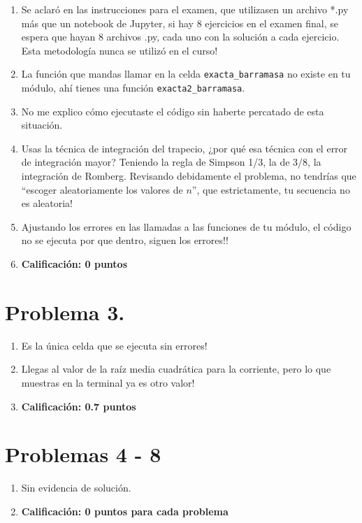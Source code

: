 \begin{enumerate}
\item Se aclaró en las instrucciones para el examen, que utilizasen un archivo *.py más que un notebook de Jupyter, si hay 8 ejercicios en el examen final, se espera que hayan 8 archivos .py, cada uno con la solución a cada ejercicio. Esta metodología nunca se utilizó en el curso!
\item La función que mandas llamar en la celda \texttt{exacta\_barramasa} no existe en tu módulo, ahí tienes una función \texttt{exacta2\_barramasa}.
\item No me explico cómo ejecutaste el código sin haberte percatado de esta situación.
\item Usas la técnica de integración del trapecio, ¿por qué esa técnica con el error de integración mayor? Teniendo la regla de Simpson 1/3, la de 3/8, la integración de Romberg. Revisando debidamente el problema, no tendrías que \enquote{escoger aleatoriamente los valores de $n$}, que estrictamente, tu secuencia no es aleatoria!
\item Ajustando los errores en las llamadas a las funciones de tu módulo, el código no se ejecuta por que dentro, siguen los errores!!
\item \textbf{Calificación: 0 puntos}
\end{enumerate}

\section{Problema 3.}

\begin{enumerate}
\item Es la única celda que se ejecuta sin errores!
\item Llegas al valor de la raíz media cuadrática para la corriente, pero lo que muestras en la terminal ya es otro valor!
\item \textbf{Calificación: 0.7 puntos}
\end{enumerate}

\section{Problemas 4 - 8}

\begin{enumerate}
\item Sin evidencia de solución.
\item \textbf{Calificación: 0 puntos para cada problema}
\end{enumerate}

